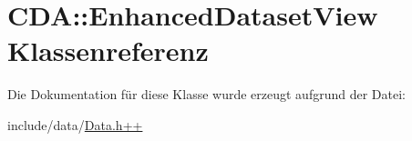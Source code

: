 \hypertarget{classCDA_1_1EnhancedDatasetView}{
\section{CDA::EnhancedDatasetView Klassenreferenz}
\label{classCDA_1_1EnhancedDatasetView}
}


Die Dokumentation für diese Klasse wurde erzeugt aufgrund der Datei:\begin{DoxyCompactItemize}
\item 
include/data/\hyperlink{Data_8h_09_09}{Data.h++}\end{DoxyCompactItemize}
